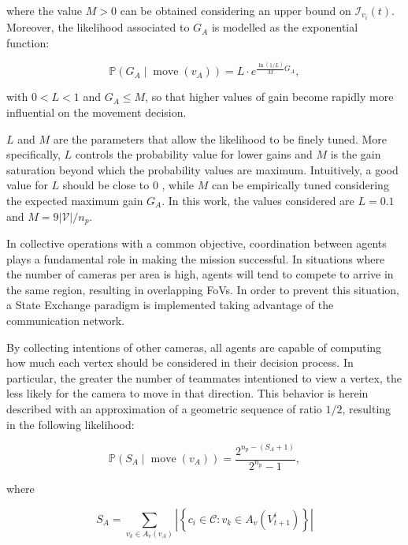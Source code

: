 \documentclass[conference]{IEEEtran}
\begin{document}
where the value $M>0$ can be obtained considering an upper bound on $\mathcal{I}_{v_{i}}(t)$. Moreover, the likelihood associated to $G_{A}$ is modelled as the exponential function:


\begin{equation*}
\mathbb{P}\left(G_{A} \mid \operatorname{move}\left(v_{A}\right)\right)=L \cdot e^{\frac{\ln (1 / L)}{M} G_{A}}, \tag{16}
\end{equation*}


with $0<L<1$ and $G_{A} \leq M$, so that higher values of gain become rapidly more influential on the movement decision.

$L$ and $M$ are the parameters that allow the likelihood to be finely tuned. More specifically, $L$ controls the probability value for lower gains and $M$ is the gain saturation beyond which the probability values are maximum. Intuitively, a good value for $L$ should be close to 0 , while $M$ can be empirically tuned considering the expected maximum gain $G_{A}$. In this work, the values considered are $L=0.1$ and $M=9|\mathcal{V}| / n_{p}$.

In collective operations with a common objective, coordination between agents plays a fundamental role in making the mission successful. In situations where the number of cameras per area is high, agents will tend to compete to arrive in the same region, resulting in overlapping FoVs. In order to prevent this situation, a State Exchange paradigm is implemented taking advantage of the communication network.

By collecting intentions of other cameras, all agents are capable of computing how much each vertex should be considered in their decision process. In particular, the greater the number of teammates intentioned to view a vertex, the less likely for the camera to move in that direction. This behavior is herein described with an approximation of a geometric sequence of ratio $1 / 2$, resulting in the following likelihood:


\begin{equation*}
\mathbb{P}\left(S_{A} \mid \operatorname{move}\left(v_{A}\right)\right)=\frac{2^{n_{p}-\left(S_{A}+1\right)}}{2^{n_{p}}-1}, \tag{17}
\end{equation*}


where


\begin{equation*}
S_{A}=\sum_{v_{k} \in A_{v}\left(v_{A}\right)}\left|\left\{c_{i} \in \mathcal{C}: v_{k} \in A_{v}\left(V_{t+1}^{i}\right)\right\}\right| \tag{18}
\end{equation*}
\end{document}

